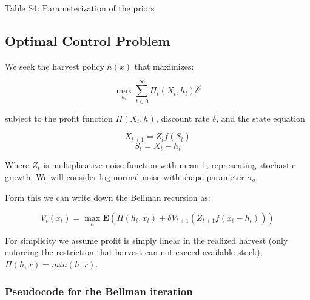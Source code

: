 \documentclass[author-year, review]{elsarticle} %
\newenvironment{Shaded}{}{}
\newcommand{\KeywordTok}[1]{\textcolor[rgb]{0.00,0.44,0.13}{\textbf{{#1}}}}
\newcommand{\DataTypeTok}[1]{\textcolor[rgb]{0.56,0.13,0.00}{{#1}}}
\newcommand{\DecValTok}[1]{\textcolor[rgb]{0.25,0.63,0.44}{{#1}}}
\newcommand{\StringTok}[1]{\textcolor[rgb]{0.25,0.44,0.63}{{#1}}}
\newcommand{\CommentTok}[1]{\textcolor[rgb]{0.38,0.63,0.69}{\textit{{#1}}}}
\newcommand{\NormalTok}[1]{{#1}}
\begin{document}
Table S4: Parameterization of the priors

\subsection{Optimal Control Problem}\label{optimal-control-problem}

We seek the harvest policy $h(x)$ that maximizes:

\[ \max_{h_t} \sum_{t \in 0}^{\infty}  \Pi_t(X_t, h_t) \delta^t  \]

subject to the profit function $\Pi(X_t,h)$, discount rate $\delta$, and
the state equation

\[X_{t+1} = Z_t f(S_t)  \] \[S_t = X_t - h_t \]

Where $Z_t$ is multiplicative noise function with mean 1, representing
stochastic growth. We will consider log-normal noise with shape
parameter $\sigma_g$.

Form this we can write down the Bellman recursion as:

\[V_t(x_t) = \max_h \mathbf{E} \left(\Pi(h_t, x_t) + \delta V_{t+1}( Z_{t+1} f(x_t - h_t)) \right)\]

For simplicity we assume profit is simply linear in the realized harvest
(only enforcing the restriction that harvest can not exceed available
stock), $\Pi(h,x) = min(h,x)$.

\subsubsection{Pseudocode for the Bellman
iteration}\label{pseudocode-for-the-bellman-iteration}

\begin{Shaded}
\end{Shaded}
\end{document}
